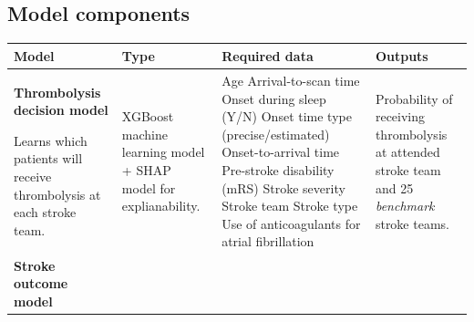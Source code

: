 \begin{landscape}
\subsection{Model components}
{
\RaggedRight
\begin{table}
\small
\raggedright
\begin{tabular}{|p{5cm}|p{5cm}|p{6cm}|p{6cm}|}

\hline
\textbf{Model} &  \textbf{Type} & \textbf{Required data} & \textbf{Outputs} \\
\hline

\textbf{Thrombolysis decision model} 

\vspace{2mm}

Learns which patients will receive thrombolysis at each stroke team. & 

XGBoost machine learning model + SHAP model for explianability. & 

Age\newline\vspace{2pt}
Arrival-to-scan time\newline\vspace{2pt}
Onset during sleep (Y/N)\newline\vspace{2pt}
Onset time type (precise/estimated)\newline\vspace{2pt}
Onset-to-arrival time\newline\vspace{2pt}
Pre-stroke disability (mRS)\newline\vspace{2pt}
Stroke severity\newline\vspace{2pt}
Stroke team\newline\vspace{2pt}
Stroke type\newline\vspace{2pt}
Use of anticoagulants for atrial fibrillation & 

Probability of receiving thrombolysis at attended stroke team and 25 \textit{benchmark} stroke teams. \\

\hline


\textbf{Stroke outcome model}

\vspace{3mm}


\end{tabular}
\end{table}}
\end{landscape}
